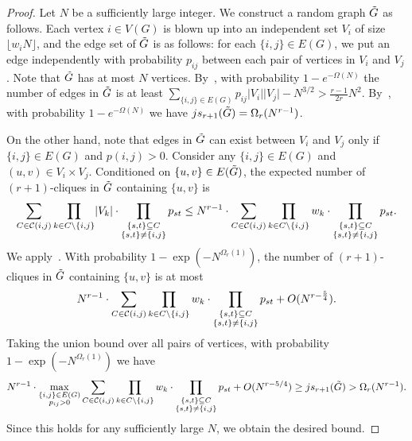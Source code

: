\documentclass[11pt,a4paper]{article}
\theoremstyle{definition}
\theoremstyle{remark}
\newcommand{\C}[1]{{\protect\mathcal{#1}}}
\newcommand{\floor}[1]{\lfloor #1\rfloor}
\newcommand*{\abs}[1]{\lvert#1\rvert}
\begin{document}
\begin{proof} 
Let $N$ be a sufficiently large integer. 
    We construct a random graph $\Tilde{G}$ as follows. Each vertex $i \in V(G)$ is blown up into an independent set $V_i$ of size $\floor{w_i N}$, and the edge set of $\Tilde{G}$ is as follows: for each $\{i,j\} \in E(G)$, we put an edge independently with probability $p_{ij}$ between each pair of vertices in $V_i$ and $V_j$. Note that $\Tilde{G}$ has at most $N$ vertices. By~, with probability $1 - e^{-\Omega(N)}$ the number of edges in $\Tilde{G}$ is at least $\sum_{\{i,j\} \in E(G)} p_{ij} \abs{V_i} \abs{V_j} - N^{3/2} 
    > \frac{r-1}{2r}N^2.$
    By~, 
    with probability $1 - e^{-\Omega(N)}$ 
    we have $js_{r+1}(\Tilde{G}) = \Omega_r (N^{r-1})$. 
    
    On the other hand, note that edges in $\Tilde{G}$ can exist between $V_i$ and $V_j$ only if $\{i,j\} \in E(G)$ and $ p(i, j) > 0$. 
    Consider any $\{i,j\} \in E(G)$ and $(u,v)\in V_i\times V_j$. Conditioned on $\{u, v\} \in E(\Tilde{G})$, the expected number of $(r+1)$-cliques in $\Tilde{G}$ containing $\{u, v\}$ is
    $$\sum_{C \in \C C(i, j)} \prod_{k\in C\setminus \{i,j\}} \abs{V_k} \cdot \prod_{ \substack{\{s,t\}\subseteq C \\
      \{s,t\} \neq \{i,j\} } } p_{st}
    \leq N^{r-1} \cdot \sum_{C \in \C C(i, j)}  
    \prod_{k\in C\setminus \{i,j\}} w_k \cdot 
    \prod_{\substack{\{s,t\}\subseteq C \\
      \{s,t\} \neq \{i,j\} } } p_{st}.$$
  We apply~. With probability $1 - \exp(-N^{\Omega_r(1)})$, the number of $(r+1)$-cliques in $\Tilde{G}$ containing $\{u, v\}$ is at most 
    $$N^{r-1} \cdot \sum_{C \in \C C(i, j)}  
    \prod_{k\in C\setminus \{i,j\}} w_k \cdot 
    \prod_{\substack{\{s,t\}\subseteq C \\
      \{s,t\} \neq \{i,j\} } } p_{st} + O(N^{r- \frac{5}{4}}).$$
    Taking the union bound over all pairs of vertices, with probability $1 - \exp(-N^{\Omega_r(1)})$ we have
    $$N^{r-1} \cdot 
    \max_{\substack{\{i,j\}\in E(G)\\ p_{ij}>0}} 
    \sum_{C \in \C C(i, j)}  
    \prod_{k\in C\setminus \{i,j\}} w_k \cdot 
    \prod_{\substack{\{s,t\}\subseteq C \\
      \{s,t\} \neq \{i,j\} } } p_{st} + O(N^{r-5/4})\ge js_{r+1}(\Tilde{G})
    > \Omega_r(N^{r-1}).$$
    Since this holds for any sufficiently large $N$, we 
    obtain the desired bound. 
\end{proof}
\end{document}
